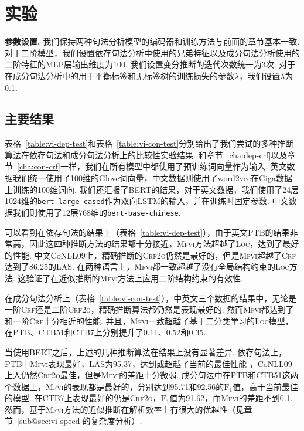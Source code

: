 \section{实验}\label{sec:vi-exp}

\noindent\textbf{参数设置.}
我们保持两种句法分析模型的编码器和训练方法与前面的章节基本一致.
对于二阶模型，我们设置依存句法分析中使用的兄弟特征以及成分句法分析使用的二阶特征的MLP层输出维度为100.
我们设置变分推断的迭代次数统一为3次.
对于在成分句法分析中的用于平衡标签和无标签树的训练损失的参数$\lambda$，我们设置$\lambda$为0.1.



\subsection{主要结果}
表格~\ref{table:vi-dep-test}和表格~\ref{table:vi-con-test}分别给出了我们尝试的多种推断算法在依存句法和成分句法分析上的比较性实验结果.
和章节~\ref{cha:dep-crf}以及章节~\ref{cha:con-crf}一样，我们在所有模型中都使用了预训练词向量作为输入.
英文数据我们统一使用了100维的Glove词向量，中文数据则使用了word2vec在Giga数据上训练的100维词向.
我们还汇报了BERT的结果，对于英文数据，我们使用了24层1024维的\texttt{bert-large-cased}作为双向LSTM的输入，并在训练时固定参数.
中文数据我们则使用了12层768维的\texttt{bert-base-chinese}.

可以看到在依存句法的结果上（表格~\ref{table:vi-dep-test}），由于英文PTB的结果非常高，因此这四种推断方法的结果都十分接近，\textsc{Mfvi}方法超越了\textsc{Loc}，达到了最好的性能.
中文CoNLL09上，精确推断的\textsc{Crf2o}仍然是最好的，但是\textsc{Mfvi}超越了\textsc{Crf}达到了86.25的LAS.
在两种语言上，\textsc{Mfvi}都一致超越了没有全局结构约束的\textsc{Loc}方法.
这验证了在近似推断的\textsc{Mfvi}方法上应用二阶结构约束的有效性.

在成分句法分析上（表格~\ref{table:vi-con-test}），中英文三个数据的结果中，无论是一阶\textsc{Crf}还是二阶\textsc{Crf2o}，精确推断算法都仍然是表现最好的.
然而\textsc{Mfvi}都达到了和一阶\textsc{Crf}十分相近的性能.
并且，\textsc{Mfvi}一致超越了基于二分类学习的\textsc{Loc}模型，在PTB、CTB51和CTB7上分别提升了0.11、0.52和0.35.

当使用BERT之后，上述的几种推断算法在结果上没有显著差异.
依存句法上，PTB中\textsc{Mfvi}表现最好，LAS为95.37，达到或超越了当前的最佳性能 \citep{zhou-zhao-2019-head,wang-tu-2020-second}，CoNLL09上人仍然\textsc{Crf2o}最佳，但是\textsc{Mfvi}的差距十分微弱.
成分句法中在PTB和CTB51这两个数据上，\textsc{Mfvi}的表现都是最好的，分别达到95.71和92.56的$\mathrm{F}_1$值，高于当前最佳的模型\cite{kitaev-etal-2019-multilingual}.
在CTB7上表现最好的仍是\textsc{Crf2o}，$\mathrm{F}_1$值为91.62，而\textsc{Mfvi}的差距不到0.1.
然而，基于\textsc{Mfvi}方法的近似推断在解析效率上有很大的优越性（见章节~\ref{sub@sec:vi-speed}的复杂度分析）.

